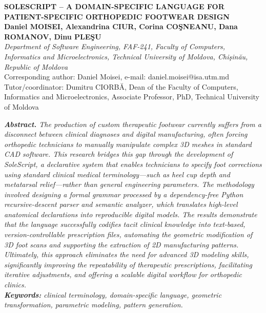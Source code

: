 \documentclass[12pt,a4paper]{article}
\begin{document}
\begin{center}
{\fontsize{14pt}{16pt}\selectfont\textbf{SOLESCRIPT -- A DOMAIN-SPECIFIC LANGUAGE FOR PATIENT-SPECIFIC ORTHOPEDIC FOOTWEAR DESIGN}}\\[0.8em]
{\fontsize{12pt}{14pt}\selectfont\textbf{Daniel MOISEI, Alexandrina CIUR, Corina CO\c{S}NEANU, Dana ROMANOV, Dinu PLE\c{S}U}}\\[0.5em]
{\fontsize{10pt}{12pt}\selectfont\textit{Department of Software Engineering, FAF-241, Faculty of Computers, Informatics and Microelectronics, Technical University of Moldova, Chi\c{s}in\u{a}u, Republic of Moldova}}\\[0.3em]
{\fontsize{10pt}{12pt}\selectfont *Corresponding author: Daniel Moisei, e-mail: daniel.moisei@isa.utm.md}\\[0.3em]
{\fontsize{10pt}{12pt}\selectfont Tutor/coordinator: Dumitru CIORB\u{A}, Dean of the Faculty of Computers, Informatics and Microelectronics, Associate Professor, PhD, Technical University of Moldova}
\end{center}

\noindent\textit{\textbf{Abstract.} The production of custom therapeutic footwear currently suffers from a disconnect between clinical diagnoses and digital manufacturing, often forcing orthopedic technicians to manually manipulate complex 3D meshes in standard CAD software. This research bridges this gap through the development of SoleScript, a declarative system that enables technicians to specify foot corrections using standard clinical medical terminology—such as heel cup depth and metatarsal relief—rather than general engineering parameters. The methodology involved designing a formal grammar processed by a dependency-free Python recursive-descent parser and semantic analyzer, which translates high-level anatomical declarations into reproducible digital models. The results demonstrate that the language successfully codifies tacit clinical knowledge into text-based, version-controllable prescription files, automating the geometric modification of 3D foot scans and supporting the extraction of 2D manufacturing patterns. Ultimately, this approach eliminates the need for advanced 3D modeling skills, significantly improving the repeatability of therapeutic prescriptions, facilitating iterative adjustments, and offering a scalable digital workflow for orthopedic clinics.}\\[0.5em]
\noindent\textit{\textbf{Keywords:} clinical terminology, domain-specific language, geometric transformation, parametric modeling, pattern generation.}
\end{document}
